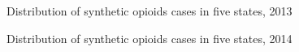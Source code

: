 \documentclass{mcmthesis}
\numberwithin{equation}{section}
\numberwithin{figure}{section}
\numberwithin{table}{section}
\theoremstyle{mydef}
\begin{document}
\begin{appendices}
\begin{figure}[H]
  \label{figop12}
\end{figure}
\begin{figure}[H]
  \caption{Distribution of synthetic opioids cases in five states, 2013}
  \label{figop13}
\end{figure}
\begin{figure}[H]
  \caption{Distribution of synthetic opioids cases in five states, 2014}
  \label{figop14}
\end{figure}
\begin{figure}[H]

\end{figure}
\end{appendices}
\end{document}
